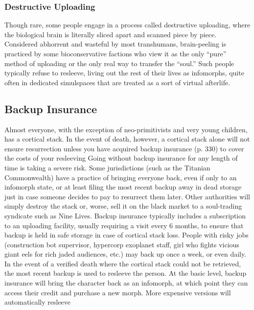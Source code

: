 \subsubsection{Destructive Uploading}

Though rare, some people engage in a process called 
destructive uploading, where the biological brain is literally
sliced apart and scanned piece by piece. Considered
abhorrent and wasteful by most transhumans, brain-peeling
is practiced by some bioconservative factions
who view it as the only ``pure'' method of uploading 
or the only real way to transfer the ``soul.'' Such people 
typically refuse to resleeve, living out the rest of their 
lives as infomorphs, quite often in dedicated simulspaces 
that are treated as a sort of virtual afterlife.

\subsection{Backup Insurance}

Almost everyone, with the exception of neo-primitivists 
and very young children, has a cortical stack. In the 
event of death, however, a cortical stack alone will not 
ensure resurrection unless you have acquired backup 
insurance (p. 330) to cover the costs of your resleeving
Going without backup insurance for any length of
time is taking a severe risk. Some jurisdictions (such 
as the Titanian Commonwealth) have a practice of 
bringing everyone back, even if only to an infomorph 
state, or at least filing the most recent backup away 
in dead storage just in case someone decides to pay 
to resurrect them later. Other authorities will simply 
destroy the stack or, worse, sell it on the black market 
to a soul-trading syndicate such as Nine Lives.
Backup insurance typically includes a subscription 
to an uploading facility, usually requiring a visit every 
6 months, to ensure that backup is held in safe storage
in case of cortical stack loss. People with risky
jobs (construction bot supervisor, hypercorp exoplanet
staff, girl who fights vicious giant eels for rich
jaded audiences, etc.) may back up once a week, or 
even daily. In the event of a verified death where the 
cortical stack could not be retrieved, the most recent 
backup is used to resleeve the person.
At the basic level, backup insurance will bring the 
character back as an infomorph, at which point they 
can access their credit and purchase a new morph. 
More expensive versions will automatically resleeve 

